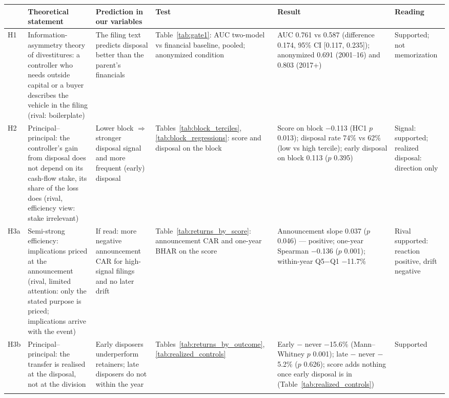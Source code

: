 \begin{tabular}{>{\raggedright\arraybackslash}p{0.8cm}>{\raggedright\arraybackslash}p{4.6cm}>{\raggedright\arraybackslash}p{3.6cm}>{\raggedright\arraybackslash}p{3.0cm}>{\raggedright\arraybackslash}p{6.0cm}>{\raggedright\arraybackslash}p{2.6cm}}
\toprule
 & Theoretical statement & Prediction in our variables & Test & Result & Reading \\
\midrule
H1 & Information-asymmetry theory of divestitures: a controller who needs outside capital or a buyer describes the vehicle in the filing (rival: boilerplate) & The filing text predicts disposal better than the parent's financials & Table~\ref{tab:gate1}: AUC two-model vs financial baseline, pooled; anonymized condition & AUC 0.761 vs 0.587 (difference 0.174, 95\% CI [0.117, 0.235]); anonymized 0.691 (2001--16) and 0.803 (2017+) & Supported; not memorization \\ \addlinespace[2pt]
H2 & Principal--principal: the controller's gain from disposal does not depend on its cash-flow stake, its share of the loss does (rival, efficiency view: stake irrelevant) & Lower block $\Rightarrow$ stronger disposal signal and more frequent (early) disposal & Tables~\ref{tab:block_terciles}, \ref{tab:block_regressions}: score and disposal on the block & Score on block $-$0.113 (HC1 $p$ 0.013); disposal rate 74\% vs 62\% (low vs high tercile); early disposal on block 0.113 ($p$ 0.395) & Signal: supported; realized disposal: direction only \\ \addlinespace[2pt]
H3a & Semi-strong efficiency: implications priced at the announcement (rival, limited attention: only the stated purpose is priced; implications arrive with the event) & If read: more negative announcement CAR for high-signal filings and no later drift & Table~\ref{tab:returns_by_score}: announcement CAR and one-year BHAR on the score & Announcement slope 0.037 ($p$ 0.046) --- positive; one-year Spearman $-$0.136 ($p$ 0.001); within-year Q5$-$Q1 $-$11.7\% & Rival supported: reaction positive, drift negative \\ \addlinespace[2pt]
H3b & Principal--principal: the transfer is realised at the disposal, not at the division & Early disposers underperform retainers; late disposers do not within the year & Tables~\ref{tab:returns_by_outcome}, \ref{tab:realized_controls} & Early $-$ never $-$15.6\% (Mann--Whitney $p$ 0.001); late $-$ never $-$5.2\% ($p$ 0.626); score adds nothing once early disposal is in (Table~\ref{tab:realized_controls}) & Supported \\ \addlinespace[2pt]

\end{tabular}
